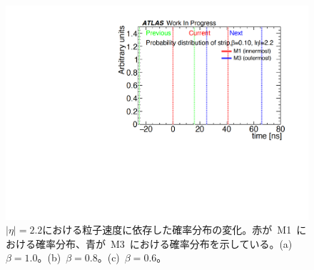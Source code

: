 \begin{figure}[tbp]
\begin{minipage}{0.33\hsize}
    \subcaption{}
    \end{minipage}
    \begin{minipage}{0.33\hsize}
    \centering   
    \includegraphics[width=\textwidth,page=7]{img/rec/rec_e2.2_s.pdf}
    \subcaption{}
    \end{minipage}
    \caption[$|\eta|=2.2$における粒子速度に依存した確率分布の変化]{$|\eta|=2.2$における粒子速度に依存した確率分布の変化。赤が~M1~における確率分布、青が~M3~における確率分布を示している。(a)~$\beta=1.0$。(b)~$\beta=0.8$。(c)~$\beta=0.6$。}\label{fig:recbeta1}
\end{figure}

